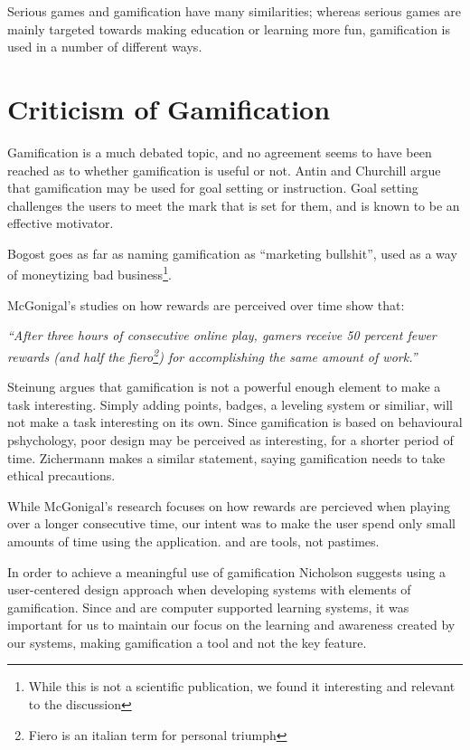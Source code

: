 Serious games and gamification have many similarities; whereas serious games are mainly targeted towards making education or learning more fun, gamification is used in a number of different ways. 


\section{Criticism of Gamification}
\label{sec:gamificationdiscussion}

Gamification is a much debated topic, and no agreement seems to have been reached as to whether gamification is useful or not. 
Antin and Churchill argue that gamification may be used for goal setting or instruction\cite{antin2011badges}. Goal setting challenges the users to meet the mark that is set for them, and is known to be an effective motivator\cite{ling2005using}. 

Bogost goes as far as naming gamification as ``marketing bullshit'', used as a way of moneytizing bad business\cite{gamificationbullshit}\footnote{While this is not a scientific publication, we found it interesting and relevant to the discussion}.

McGonigal's studies on how rewards are perceived over time show that: 

\textit{``After three hours of consecutive online play, gamers receive 50 percent fewer rewards (and half the fiero\footnote{Fiero is an italian term for personal triumph\cite{ekman2007emotions}}) for accomplishing the same amount of work.''}\cite{jane2011reality}

Steinung argues that gamification is not a powerful enough element to make a task interesting\cite{steinung2012interessante}. Simply adding points, badges, a leveling system or similiar, will not make a task interesting on its own. Since gamification is based on behavioural pshychology, poor design may be perceived as interesting, for a shorter period of time\cite{steinung2012interessante}. Zichermann makes a similar statement, saying gamification needs to take ethical precautions\cite{zichermann2011gamification}.

While McGonigal's research focuses on how rewards are percieved when playing over a longer consecutive time, our intent was to make the user spend only small amounts of time using the application. \ab{} and \app{} are tools, not pastimes.

In order to achieve a meaningful use of gamification Nicholson\cite{nicholson2012user} suggests using a user-centered design approach\cite{usercentereddesign} when developing systems with elements of gamification. Since \ab{} and \app{} are computer supported learning systems\cite{stahl2006computer}, it was important for us to maintain our focus on the learning and awareness created by our systems, making gamification a tool and not the key feature.


